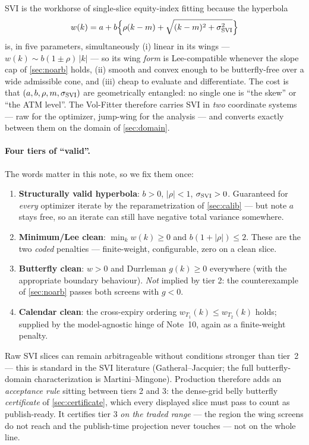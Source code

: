 \documentclass[11pt]{article}
\begin{document}
SVI is the workhorse of single-slice equity-index fitting because the hyperbola
\begin{equation}
w(k)=a+b\Big\{\rho(k-m)+\sqrt{(k-m)^2+\sigma_{\mathrm{SVI}}^2}\Big\}
\label{eq:rawsvi}
\end{equation}
is, in five parameters, simultaneously (i) linear in its wings ---
$w(k)\sim b(1\pm\rho)\,|k|$ --- so its wing \emph{form} is Lee-compatible
whenever the slope cap of \cref{sec:noarb} holds, (ii) smooth and
convex enough to be butterfly-free over a wide admissible cone, and (iii) cheap
to evaluate and differentiate. The cost is that $(a,b,\rho,m,\sigma_{\mathrm{SVI}})$ are
geometrically entangled: no single one is ``the skew'' or ``the ATM level''. The
Vol-Fitter therefore carries SVI in \emph{two} coordinate systems --- raw for the
optimizer, jump-wing for the analysis --- and converts exactly between them on
the domain of \cref{sec:domain}.

\paragraph{Four tiers of ``valid''.} The words matter in this note, so we fix
them once:
\begin{enumerate}[leftmargin=1.6em]
\item \textbf{Structurally valid hyperbola}: $b>0$, $|\rho|<1$, $\sigma_{\mathrm{SVI}}>0$.
Guaranteed for \emph{every} optimizer iterate by the reparametrization of
\cref{sec:calib} --- but note $a$ stays free, so an iterate can still have
negative total variance somewhere.
\item \textbf{Minimum/Lee clean}: $\min_k w(k)\ge0$ and $b(1+|\rho|)\le2$.
These are the two \emph{coded} penalties --- finite-weight, configurable, zero
on a clean slice.
\item \textbf{Butterfly clean}: $w>0$ and Durrleman $g(k)\ge0$ everywhere
(with the appropriate boundary behaviour). \emph{Not} implied by tier 2: the
counterexample of \cref{sec:noarb} passes both screens with $g<0$.
\item \textbf{Calendar clean}: the cross-expiry ordering
$w_{T_1}(k)\le w_{T_2}(k)$ holds; supplied by the model-agnostic hinge of
Note~10, again as a finite-weight penalty.
\end{enumerate}
Raw SVI slices can remain arbitrageable without conditions stronger than
tier~2 --- this is standard in the SVI literature (Gatheral--Jacquier; the
full butterfly-domain characterization is Martini--Mingone). Production
therefore adds an \emph{acceptance rule} sitting between tiers 2 and 3: the
dense-grid belly butterfly \emph{certificate} of \cref{sec:certificate},
which every displayed slice must pass to count as publish-ready. It certifies
tier 3 \emph{on the traded range} --- the region the wing screens do not
reach and the publish-time projection never touches --- not on the whole
line.
\end{document}
